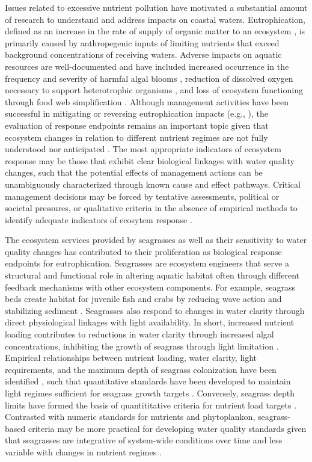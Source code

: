 \documentclass[letterpaper,12pt,oneside]{article}\usepackage[]{graphicx}\usepackage[]{color}
\begin{document}
Issues related to excessive nutrient pollution have motivated a substantial amount of research to understand and address impacts on coastal waters.  Eutrophication, defined as an increase in the rate of supply of organic matter to an ecosystem \citep{Nixon95}, is primarily caused by anthropegenic inputs of limiting nutrients that exceed background concentrations of receiving waters.  Adverse impacts on aquatic resources are well-documented and have included increased occurrence in the frequency and severity of harmfal algal blooms \citep{Cloern96}, reduction of dissolved oxygen necessary to support heterotrophic organisms \citep{Justic87,Diaz08}, and loss of ecosystem functioning through food web simplification \citep{Tewfik07}. Although management activities have been successful in mitigating or reversing eutrophication impacts (e.g., \citealt{Greening06}), the evaluation of response endpoints remains an important topic given that ecosystem changes in relation to different nutrient regimes are not fully understood nor anticipated \citep{Duarte09}.  The most appropriate indicators of ecosystem response may be those that exhibit clear biological linkages with water quality changes, such that the potential effects of management actions can be unambiguously characterized through known cause and effect pathways.  Critical management decisions may be forced by tentative assessments, political or societal pressures, or qualitative criteria in the absence of empirical methods to identify adequate indicators of ecosytem response \citep{Duarte09}.  

The ecosystem services provided by seagrasses as well as their sensitivity to water quality changes has contributed to their proliferation as biological response endpoints for eutrophication.  Seagrasses are ecosystem engineers \citep{Jones94,Koch01} that serve a structural and functional role in altering aquatic habitat often through different feedback mechanisms with other ecosystem components.  For example, seagrass beds create habitat for juvenile fish and crabs by reducing wave action and stabilizing sediment \citep{williams01,Hughes09}.  Seagrasses also respond to changes in water clarity through direct physiological linkages with light availability.  In short, increased nutrient loading contributes to reductions in water clarity through increased algal concentrations, inhibiting the growth of seagrass through light limitation \citep{Duarte95}.  Empirical relationships between nutrient loading, water clarity, light requirements, and the maximum depth of seagrass colonization have been identified \citep{Duarte91,Kenworthy96,Choice14}, such that quantitative standards have been developed to maintain light regimes sufficient for seagrass growth targets \citep{Steward05}.  Conversely, seagrass depth limits have formed the basis of quantititative criteria for nutrient load targets \citep{Janicki96}.  Contrasted with numeric standards for nutrients and phytoplankon, seagrass-based criteria may be more practical for developing water quality standards given that seagrasses are integrative of system-wide conditions over time and less variable with changes in nutrient regimes \citep{Duarte95}.  
\end{document}
